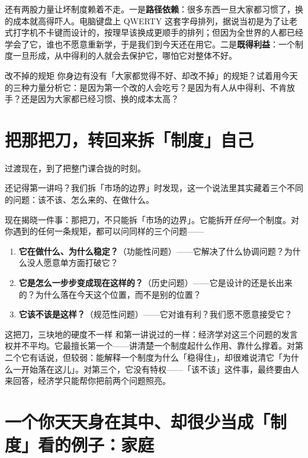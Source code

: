 \documentclass[10pt,a4paper]{ctexart}
\newcommand{\transitionnote}[1]{%
  \begin{conceptbox}{过渡}#1\end{conceptbox}%
}
\begin{document}
还有两股力量让坏制度赖着不走。一是\textbf{路径依赖}：很多东西一旦大家都习惯了，换的成本就高得吓人。电脑键盘上 QWERTY 这套字母排列，据说当初是为了让老式打字机不卡键而设计的，按理早该换成更顺手的排列；但因为全世界的人都已经学会了它，谁也不愿意重新学，于是我们到今天还在用它。二是\textbf{既得利益}：一个制度一旦形成，从中得利的人就会去保护它，哪怕它对整体不好。

\begin{discussionbox}{改不掉的规矩}
你身边有没有「大家都觉得不好、却改不掉」的规矩？试着用今天的三种力量分析它：是因为第一个改的人会吃亏？是因为有人从中得利、不肯放手？还是因为大家都已经习惯、换的成本太高？
\end{discussionbox}

\section{把那把刀，转回来拆「制度」自己}

\transitionnote{现在，到了把整门课合拢的时刻。}

还记得第一讲吗？我们拆「市场的边界」时发现，这一个说法里其实藏着三个不同的问题：该不该、怎么来的、在做什么。

现在揭晓一件事：那把刀，不只能拆「市场的边界」。它能拆开\emph{任何}一个制度。对你遇到的任何一条规矩，都可以问同样的三个问题——

\begin{enumerate}
  \item \textbf{它在做什么、为什么稳定？}（功能性问题）——它解决了什么协调问题？为什么没人愿意单方面打破它？
  \item \textbf{它是怎么一步步变成现在这样的？}（历史问题）——它是设计的还是长出来的？为什么落在今天这个位置，而不是别的位置？
  \item \textbf{它该不该是这样？}（规范性问题）——它对谁有利？我们愿不愿意接受它？
\end{enumerate}

\begin{insightbox}{这把刀，三块地的硬度不一样}
和第一讲说过的一样：经济学对这三个问题的发言权并不平均。它最擅长第一个——讲清楚一个制度起什么作用、靠什么撑着。对第二个它有话说，但较弱：能解释一个制度为什么「稳得住」，却很难说清它「为什么一开始落在这儿」。对第三个，它没有特权——「该不该」这件事，最终要由人来回答，经济学只能帮你把前两个问题照亮。
\end{insightbox}

\section{一个你天天身在其中、却很少当成「制度」看的例子：家庭}
\end{document}
